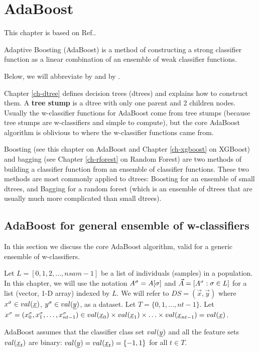 \chapter{AdaBoost}
\label{ch-adaboost}

This chapter
is based on Ref.\cite{wiki-adaboost}.


Adaptive Boosting (AdaBoost) is
a method of constructing
a strong
classifier function
as a linear
combination
of an ensemble
of weak classifier
functions.

Below,
we will abbreviate
 by 
and  by .


Chapter \ref{ch-dtree}
defines decision trees (dtrees)
and explains how to construct them.
A
{\bf tree stump}
is a dtree  with only one
parent and 2 children nodes.
Usually the
w-classifier functions
for AdaBoost
come from tree stumps
(because tree stumps
are w-classifiers
and simple to compute), but
the core
AdaBoost algorithm
is oblivious to
where the w-classifier functions came from.

Boosting
(see this chapter on AdaBoost
and
Chapter \ref{ch-xgboost} on XGBoost)
and bagging
(see Chapter \ref{ch-rforest} on Random Forest)
are two methods
of building a classifier function
from an ensemble
of classifier functions.
These two methods are most commonly
applied to dtrees: Boosting for an ensemble of
small dtrees, and Bagging for a random
forest (which
is an ensemble
of dtrees that are usually much more
complicated than small dtrees).


\section{AdaBoost for general ensemble
of w-classifiers}
In this
section
we discuss the core AdaBoost
algorithm,
valid for a generic ensemble of w-classifiers.

Let $L=[0,1,2, \ldots, nsam-1]$ be a list of
individuals (samples) in a population.
In this chapter, we will use the notation
$A^\sigma=A[\sigma]$
and $\vec{A}=[A^\sigma:\sigma\in L]$
for a  list (vector, 1-D  array) indexed by $L$.
We will refer to $DS=(\vec{x}, \vec{y})$
where $x^\s\in val(\rvx)$, $y^\s\in val(\rvy)$,
as a dataset.
Let $T=\{0,1, \dots, nt-1\}$.
Let
$x^\s=(x^\s_0, x^\s_1, \ldots, x^\s_{nt-1})
\in val(\rvx_0)\times val(\rvx_1)
\times\ldots\times
 val(\rvx_{nt-1})=val(\rvx)$.

AdaBoost assumes
that the classifier class set
$val(\rvy)$  and
all the feature sets $val(\rvx_t)$
are
binary:
$val(\rvy)=val(\rvx_t)=\{-1, 1\}$ for
all $t\in T$.


